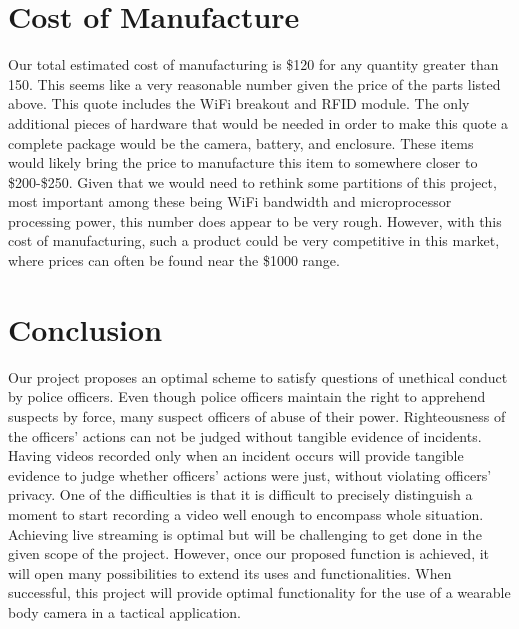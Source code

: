 \documentclass[12pt]{article}
\begin{document}
\section{Cost of Manufacture}
Our total estimated cost of manufacturing is \$120 for any quantity greater
than 150. This seems like a very reasonable number given the price of the parts
listed above. This quote includes the WiFi breakout and RFID module. The only
additional pieces of hardware that would be needed in order to make this quote
a complete package would be the camera, battery, and enclosure. These items
would likely bring the price to manufacture this item to somewhere closer to
\$200-\$250. Given that we would need to rethink some partitions of this project,
most important among these being WiFi bandwidth and microprocessor processing
power, this number does appear to be very rough. However, with this cost of
manufacturing, such a product could be very competitive in this market, where
prices can often be found near the \$1000 range.

\section{Conclusion}
Our project proposes an optimal scheme to satisfy questions of unethical
conduct by police officers. Even though police officers maintain the right to
apprehend suspects by force, many suspect officers of abuse of their power.
Righteousness of the officers’ actions can not be judged without tangible
evidence of incidents. Having videos recorded only when an incident occurs will
provide tangible evidence to judge whether officers’ actions were just, without
violating officers’ privacy. One of the difficulties is that it is difficult to
precisely distinguish a moment to start recording a video well enough to
encompass whole situation. Achieving live streaming is optimal but will be
challenging to get done in the given scope of the project. However, once our
proposed function is achieved, it will open many possibilities to extend its
uses and functionalities. When successful, this project will provide optimal
functionality for the use of a wearable body camera in a tactical application. 

\newpage



\end{document}
